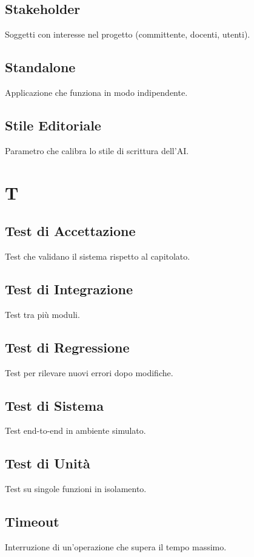 \documentclass[a4paper,12pt]{article}
\begin{document}
\subsection{Stakeholder}
Soggetti con interesse nel progetto (committente, docenti, utenti).

\subsection{Standalone}
Applicazione che funziona in modo indipendente.

\subsection{Stile Editoriale}
Parametro che calibra lo stile di scrittura dell'AI.

\section{T}
\subsection{Test di Accettazione}
Test che validano il sistema rispetto al capitolato.

\subsection{Test di Integrazione}
Test tra più moduli.

\subsection{Test di Regressione}
Test per rilevare nuovi errori dopo modifiche.

\subsection{Test di Sistema}
Test end-to-end in ambiente simulato.

\subsection{Test di Unità}
Test su singole funzioni in isolamento.

\subsection{Timeout}
Interruzione di un'operazione che supera il tempo massimo.
\end{document}
